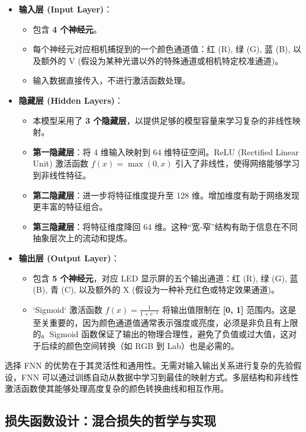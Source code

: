 \begin{itemize}
    \item \textbf{输入层 (Input Layer)}：
        \begin{itemize}
            \item 包含 \textbf{4 个神经元}。
            \item 每个神经元对应相机捕捉到的一个颜色通道值：红 (R), 绿 (G), 蓝 (B), 以及额外的 V (假设为某种光谱以外的特殊通道或相机特定校准通道)。
            \item 输入数据直接传入，不进行激活函数处理。
        \end{itemize}
    \item \textbf{隐藏层 (Hidden Layers)}：
        \begin{itemize}
            \item 本模型采用了 \textbf{3 个隐藏层}，以提供足够的模型容量来学习复杂的非线性映射。
            \item \textbf{第一隐藏层}：将 4 维输入映射到 64 维特征空间。ReLU (Rectified Linear Unit) 激活函数 $f(x) = \max(0, x)$ 引入了非线性，使得网络能够学习到非线性特征。
            \item \textbf{第二隐藏层}：进一步将特征维度提升至 128 维。增加维度有助于网络发现更丰富的特征组合。
            \item \textbf{第三隐藏层}：将特征维度降回 64 维。这种“宽-窄”结构有助于信息在不同抽象层次上的流动和提炼。
        \end{itemize}
    \item \textbf{输出层 (Output Layer)}：
        \begin{itemize}
            \item 包含 \textbf{5 个神经元}，对应 LED 显示屏的五个输出通道：红 (R), 绿 (G), 蓝 (B), 青 (C), 以及额外的 X (假设为一种补充红色或特定效果通道)。
            \item `Sigmoid` 激活函数 $f(x) = \frac{1}{1+e^{-x}}$ 将输出值限制在 \textbf{[0, 1]} 范围内。这是至关重要的，因为颜色通道值通常表示强度或亮度，必须是非负且有上限的。Sigmoid 函数保证了输出的物理合理性，避免了负值或过大值，这对于后续的颜色空间转换（如 RGB 到 Lab）也是必需的。
        \end{itemize}
\end{itemize}

选择 FNN 的优势在于其灵活性和通用性。无需对输入输出关系进行复杂的先验假设，FNN 可以通过训练自动从数据中学习到最佳的映射方式。多层结构和非线性激活函数使其能够处理高度复杂的颜色转换曲线和相互作用。

\subsection[\hspace{-2pt}损失函数设计：混合损失的哲学与实现]{{\heiti{} \hspace{-8pt}损失函数设计：混合损失的哲学与实现}}\label{section2: 损失函数设计}

